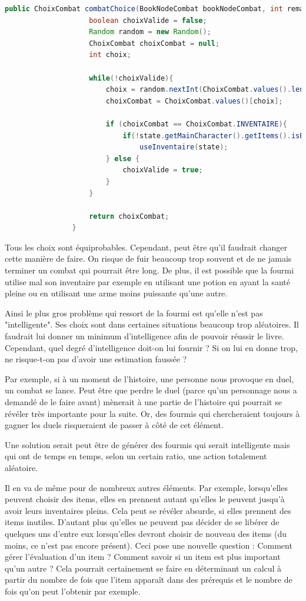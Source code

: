 			\begin{lstlisting}[gobble=16, language=java, caption=combatChoice() de Fourmis]
				public ChoixCombat combatChoice(BookNodeCombat bookNodeCombat, int remainingRoundBeforeEvasion, BookState state) {
					boolean choixValide = false;
					Random random = new Random();
					ChoixCombat choixCombat = null;
					int choix;

					while(!choixValide){
						choix = random.nextInt(ChoixCombat.values().length);
						choixCombat = ChoixCombat.values()[choix];

						if (choixCombat == ChoixCombat.INVENTAIRE){
							if(!state.getMainCharacter().getItems().isEmpty())
								useInventaire(state);
						} else {
							choixValide = true;
						}
					}

					return choixCombat;
				}
			\end{lstlisting}

			Tous les choix sont équiprobables. Cependant, peut être qu'il faudrait changer cette manière de faire. On risque de fuir beaucoup trop souvent et de ne jamais terminer un combat qui pourrait être long. De plus, il est possible que la fourmi utilise mal son inventaire par exemple en utilisant une potion en ayant la santé pleine ou en utilisant une arme moins puissante qu'une autre.

			Ainsi le plus gros problème qui ressort de la fourmi est qu'elle n'est pas "intelligente". Ses choix sont dans certaines situations beaucoup trop aléatoires. Il faudrait lui donner un minimum d'intelligence afin de pouvoir réussir le livre. Cependant, quel degré d'intelligence doit-on lui fournir ? Si on lui en donne trop, ne risque-t-on pas d'avoir une estimation faussée ?

			Par exemple, si à un moment de l'histoire, une personne nous provoque en duel, un combat se lance. Peut être que perdre le duel (parce qu'un personnage nous a demandé de le faire avant) mènerait à une partie de l'histoire qui pourrait se révéler très importante pour la suite. Or, des fourmis qui chercheraient toujours à gagner les duels risqueraient de passer à côté de cet élément.

			Une solution serait peut être de générer des fourmis qui serait intelligente mais qui ont de temps en temps, selon un certain ratio, une action totalement aléatoire.

			Il en va de même pour de nombreux autres éléments. Par exemple, lorsqu'elles peuvent choisir des items, elles en prennent autant qu'elles le peuvent jusqu'à avoir leurs inventaires pleins. Cela peut se révéler absurde, si elles prennent des items inutiles. D'autant plus qu'elles ne peuvent pas décider de se libérer de quelques uns d'entre eux lorsqu'elles devront choisir de nouveau des items (du moins, ce n'est pas encore présent). Ceci pose une nouvelle question : Comment gérer l'évaluation d'un item ? Comment savoir si un item est plus important qu'un autre ? Cela pourrait certainement se faire en déterminant un calcul à partir du nombre de fois que l'item apparaît dans des prérequis et le nombre de fois qu'on peut l'obtenir par exemple.

